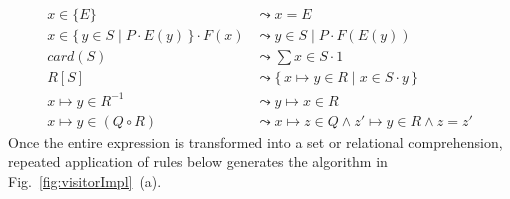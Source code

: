 \documentclass[runningheads]{llncs}
\newcommand{\Set}[2]{%
  \{\, #1 \mid #2 \, \}%
}
\newcommand{\bSet}[3]{%
  \{\, #1 \mid #2 \cdot #3 \, \}%
}
\begin{document}
\begin{align}
    \tag{Singleton membership}
    x \in \{E\} &\leadsto x = E\\
    \tag{Membership collapse} %
    x \in \bSet{y \in S}{P}{E(y)} \cdot F(x) &\leadsto y \in S \mid P \cdot F(E(y))\\
    \tag{Cardinality}
    card(S) &\leadsto \sum x \in S \cdot 1\\
    \tag{Image}
    R[S] &\leadsto \bSet{x \mapsto y \in R}{x \in S}{y}\\
    \tag{Inverse}
    x \mapsto y \in R^{-1} &\leadsto y \mapsto x \in R\\
    \tag{Composition}
    x \mapsto y \in (Q \circ R) &\leadsto x \mapsto z \in Q \land z' \mapsto y \in R \land z=z'
\end{align}
Once the entire expression is transformed into a set or relational comprehension, repeated application of rules below generates the algorithm in Fig.~\ref{fig:visitorImpl}~(a).
\end{document}
